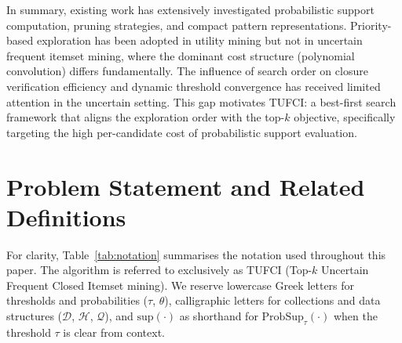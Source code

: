 \documentclass[10pt,letterpaper]{article}
\begin{document}
In summary, existing work has extensively investigated probabilistic support
computation, pruning strategies, and compact pattern representations. Priority-based
exploration has been adopted in utility mining but not in uncertain frequent itemset
mining, where the dominant cost structure (polynomial convolution) differs
fundamentally. The influence of search order on closure verification efficiency and
dynamic threshold convergence has received limited attention in the uncertain
setting. This gap motivates TUFCI: a best-first search framework that aligns the
exploration order with the top-$k$ objective, specifically targeting the high
per-candidate cost of probabilistic support evaluation.

\section*{Problem Statement and Related Definitions}

For clarity, Table~\ref{tab:notation} summarises the notation used throughout this paper.
The algorithm is referred to exclusively as TUFCI (Top-$k$ Uncertain Frequent Closed
Itemset mining). We reserve lowercase Greek letters for thresholds and probabilities
($\tau$, $\theta$), calligraphic letters for collections and data structures
($\mathcal{D}$, $\mathcal{H}$, $\mathcal{Q}$), and $\mathrm{sup}(\cdot)$ as shorthand
for $\mathrm{ProbSup}_{\tau}(\cdot)$ when the threshold $\tau$ is clear from context.
\end{document}

